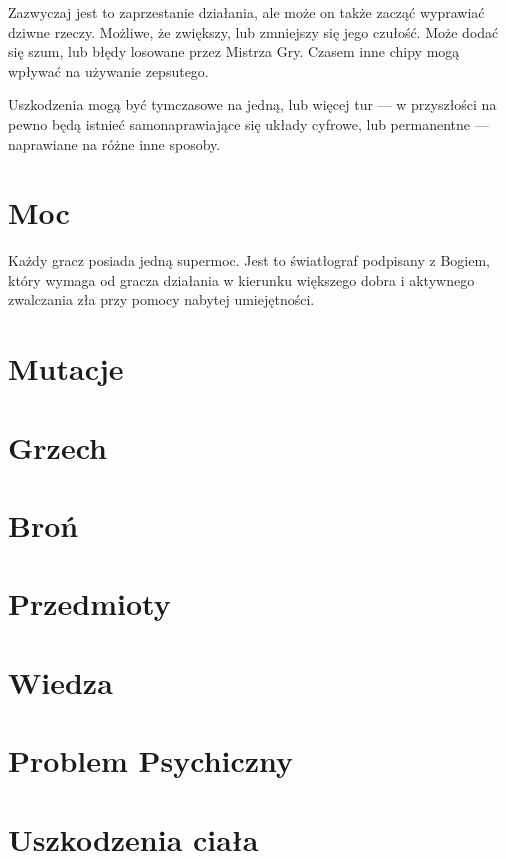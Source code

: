 Zazwyczaj jest to zaprzestanie działania, ale może on także zacząć wyprawiać dziwne rzeczy.
Możliwe, że zwiększy, lub zmniejszy się jego czułość.
Może dodać się szum, lub błędy losowane przez Mistrza Gry.
Czasem inne chipy mogą wpływać na używanie zepsutego.

Uszkodzenia mogą być tymczasowe na jedną, lub więcej tur --- w przyszłości na pewno będą istnieć samonaprawiające się układy cyfrowe, lub permanentne --- naprawiane na różne inne sposoby.

\section{Moc}
Każdy gracz posiada jedną supermoc.
Jest to światłograf podpisany z Bogiem, który wymaga od gracza działania w kierunku większego dobra i aktywnego zwalczania zła przy pomocy nabytej umiejętności.

\section{Mutacje}

\section{Grzech}

\section{Broń}
\section{Przedmioty}
\section{Wiedza}
\section{Problem Psychiczny}
\section{Uszkodzenia ciała}




